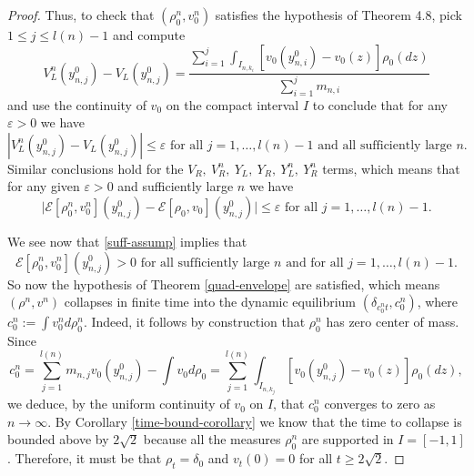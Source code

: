 \documentclass[11pt]{article}
\numberwithin{equation}{section}
\begin{document}
\begin{proof}
        Thus, to check that $(\rho^n_0,v_0^n)$ satisfies the hypothesis of Theorem 4.8, pick $1\leq j\leq l(n)-1$ and compute 
        $$V^n_L(y^0_{n,j})-V_L(y^0_{n,j})=\frac{\sum_{i=1}^j\int_{I_{n,k_i}}[v_0(y^0_{n,i})-v_0(z)]\rho_0(dz)}{\sum_{i=1}^jm_{n,i}}$$
        and use the continuity of $v_0$ on the compact interval $I$ to conclude that for any $\varepsilon>0$ we have $$|V^n_L(y^0_{n,j})-V_L(y^0_{n,j})|\leq \varepsilon\mbox{ for all }j=1,\ldots,l(n)-1\mbox{ and all sufficiently large }n.$$
        Similar conclusions hold for the $V_R,\ V_R^n,\ Y_L,\ Y_R,\ Y_L^n,\ Y_R^n$ terms, which means that for any given $\varepsilon>0$ and sufficiently large $n$ we have 
        $$\big|\mathcal{E}[\rho_0^n,v_0^n](y^0_{n,j})-\mathcal{E}[\rho_0,v_0](y^0_{n,j})\big|\leq\varepsilon\mbox{ for all }j=1,\ldots,l(n)-1.$$
       
        We see now that \eqref{suff-assump} implies that 
        $$\mathcal{E}[\rho_0^n,v_0^n](y^0_{n,j})>0\mbox{ for all sufficiently large }n\mbox{ and for all }j=1,\ldots,l(n)-1.$$
        So now the hypothesis of Theorem \ref{quad-envelope} are satisfied, which means $(\rho^n,v^n)$ collapses in finite time into the dynamic equilibrium $(\delta_{c^n_0t},c^n_0)$, where $c^n_0:=\int v_0^nd\rho_0^n$. Indeed, it follows by construction that $\rho_0^n$ has zero center of mass. Since 
        $$c_0^n=\sum_{j=1}^{l(n)}m_{n,j}v_0(y_{n,j}^0)-\int v_0d\rho_0=\sum_{j=1}^{l(n)}\int_{I_{n,k_j}}[v_0(y^0_{n,j})-v_0(z)]\rho_0(dz),$$
        we deduce, by the uniform continuity of $v_0$ on $I$, that $c_0^n$ converges to zero as $n\rightarrow\infty$. By Corollary \ref{time-bound-corollary} we know that the time to collapse is bounded above by $2\sqrt{2}$ because all the measures $\rho_0^n$ are supported in $I=[-1,1]$. Therefore, it must be that $\rho_t=\delta_0$ and $v_t(0)=0$ for all $t\geq2\sqrt{2}$. 
        \end{proof}
\end{document}
